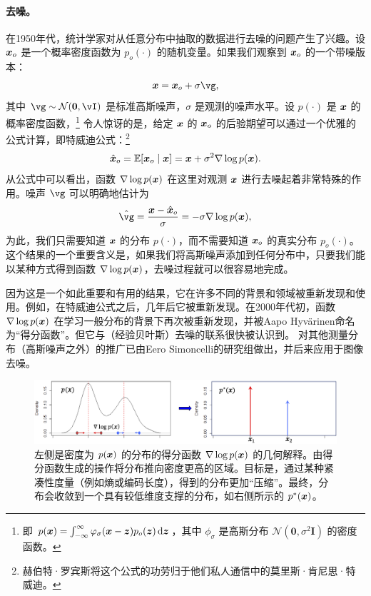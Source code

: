 \documentclass[../../book-main.tex]{subfiles}
\begin{document}
\paragraph{去噪。} 在1950年代，统计学家对从任意分布中抽取的数据进行去噪的问题产生了兴趣。设 $\bm{x}_o$ 是一个概率密度函数为 $p_o(\cdot)$ 的随机变量。如果我们观察到 $\bm{x}_o$ 的一个带噪版本：
\begin{equation}
    \x = \x_o + \sigma \vg, 
\end{equation}
其中 $\vg \sim \dNorm(\vzero, \vI)$ 是标准高斯噪声，$\sigma$ 是观测的噪声水平。设 $p(\cdot)$ 是 $\bm{x}$ 的概率密度函数，\footnote{即 $p(\x) = \int_{-\infty}^{\infty} \phi_{\sigma}(\x - \z)p_o(\z) \odif{\z}$，其中 $\phi_{\sigma}$ 是高斯分布 $\mathcal{N}(\boldsymbol{0}, \sigma^2 \boldsymbol{I})$ 的密度函数。} 令人惊讶的是，给定 $\bm{x}$ 的 $\bm{x}_o$ 的后验期望可以通过一个优雅的公式计算，即特威迪公式\cite{Robbins1956AnEB}：\footnote{赫伯特·罗宾斯将这个公式的功劳归于他们私人通信中的莫里斯·肯尼思·特威迪。}
\begin{equation}
    \hat {\bm{x}}_o = \mathbb{E}[\bm{x}_o\mid \bm{x}] = \bm{x} + \sigma^2 \nabla \log p(\bm{x}).
\end{equation}
从公式中可以看出，函数 $\nabla \log p(\bm{x})$ 在这里对观测 $\bm{x}$ 进行去噪起着非常特殊的作用。噪声 $\vg$ 可以明确地估计为
\begin{equation}
    \hat{\vg} = \frac{\x - \hat \x_o}{\sigma} = -\sigma \nabla \log p(\x),
\end{equation}
为此，我们只需要知道 $\bm{x}$ 的分布 $p(\cdot)$，而不需要知道 $\bm{x}_o$ 的真实分布 $p_o(\cdot)$。这个结果的一个重要含义是，如果我们将高斯噪声添加到任何分布中，只要我们能以某种方式得到函数 $\nabla \log p(\bm{x})$，去噪过程就可以很容易地完成。

因为这是一个如此重要和有用的结果，它在许多不同的背景和领域被重新发现和使用。例如，在特威迪公式\cite{Robbins1956AnEB}之后，几年后它被\cite{Miyasawa61}重新发现。在2000年代初，函数 $\nabla \log p(\bm{x})$ 在学习一般分布的背景下再次被重新发现，并被Aapo Hyv\"{a}rinen命名为“得分函数”\cite{hyvarinen05a}。但它与（经验贝叶斯）去噪的联系很快被\cite{Vincent2011}认识到。
对其他测量分布（高斯噪声之外）的推广已由Eero Simoncelli的研究组\cite{Raphan10}做出，并后来应用于图像去噪\cite{Kadkhodaie21a,ho2020denoising}。

\begin{figure}
    \centering
    \includegraphics[width=1\linewidth]{figs_chap1/Density-compress.png}
    \caption{左侧是密度为 $p(\bm{x})$ 的分布的得分函数 $\nabla \log p(\bm{x})$ 的几何解释。由得分函数生成的操作将分布推向密度更高的区域。目标是，通过某种紧凑性度量（例如熵或编码长度），得到的分布更加“压缩”。最终，分布会收敛到一个具有较低维度支撑的分布，如右侧所示的 $p^*(\bm{x})$。}
    \label{fig:score-function}
\end{figure}
\end{document}
